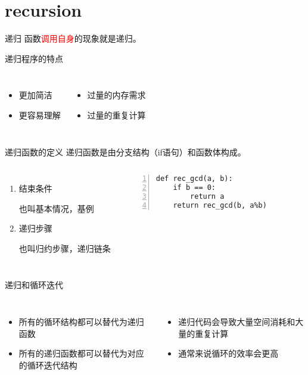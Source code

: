 \documentclass{beamer}
\begin{document}
\section{recursion}
\begin{frame}{递归}
函数\textcolor{red}{调用自身}的现象就是递归。
\begin{block}{递归程序的特点}
\begin{columns}
\begin{itemize}
\item
更加简洁 
\item
更容易理解
\end{itemize}
\begin{itemize}
\item
过量的内存需求
\item
过量的重复计算
\end{itemize}
\end{columns}
\end{block}
\end{frame}

\begin{frame}[fragile]{递归函数的定义}
递归函数是由分支结构（if语句）和函数体构成。
\begin{columns}

\begin{enumerate}
\item 结束条件

也叫基本情况，基例
\item 递归步骤

也叫归约步骤，递归链条
\end{enumerate}


\begin{Verbatim}[numbers=left,frame=single,rulecolor=\color{red}]
def rec_gcd(a, b):
    if b == 0:
        return a
    return rec_gcd(b, a%b)
\end{Verbatim}


\end{columns}

\end{frame}

\begin{frame}{递归和循环迭代}
\begin{columns}
\begin{itemize}
\item
所有的循环结构都可以替代为递归函数
\item
所有的递归函数都可以替代为对应的循环迭代结构
\end{itemize}
\begin{itemize}
\item
递归代码会导致大量空间消耗和大量的重复计算
\item
通常来说循环的效率会更高                        

\end{itemize}
\end{columns}
\end{frame}
\end{document}

